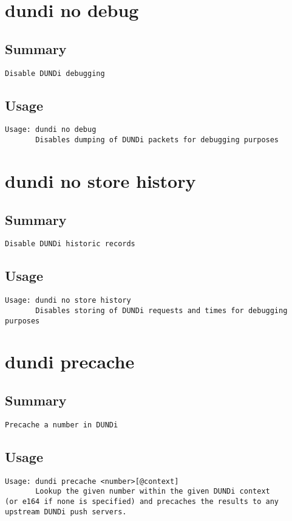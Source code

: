 \section{dundi no debug}
\subsection{Summary}
\begin{verbatim}
Disable DUNDi debugging
\end{verbatim}
\subsection{Usage}
\begin{verbatim}
Usage: dundi no debug
       Disables dumping of DUNDi packets for debugging purposes

\end{verbatim}


\section{dundi no store history}
\subsection{Summary}
\begin{verbatim}
Disable DUNDi historic records
\end{verbatim}
\subsection{Usage}
\begin{verbatim}
Usage: dundi no store history
       Disables storing of DUNDi requests and times for debugging
purposes

\end{verbatim}


\section{dundi precache}
\subsection{Summary}
\begin{verbatim}
Precache a number in DUNDi
\end{verbatim}
\subsection{Usage}
\begin{verbatim}
Usage: dundi precache <number>[@context]
       Lookup the given number within the given DUNDi context
(or e164 if none is specified) and precaches the results to any
upstream DUNDi push servers.

\end{verbatim}


